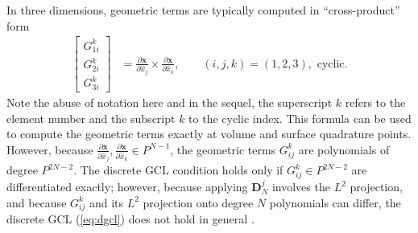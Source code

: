 \documentclass[10pt]{amsart}
\theoremstyle{definition}
\theoremstyle{lemma}
\theoremstyle{theorem}
\theoremstyle{assumption}
\renewcommand{\hat}{\widehat}
\newcommand{\pd}[2]{\frac{\partial#1}{\partial#2}}
\newcommand{\LRs}[1]{\left[ #1 \right]}
\begin{document}
{In three dimensions, geometric terms are typically computed in ``cross-product'' form
\begin{align}
\LRs{\begin{array}{c}
G^k_{1i}\\
G^k_{2i}\\
G^k_{3i}\end{array}} &= \pd{\bm{x}}{\hat{x}_j}\times \pd{\bm{x}}{\hat{x}_k}, \qquad (i,j,k) = (1,2,3), \text{ cyclic}.
\end{align}
Note the abuse of notation here and in the sequel, the superscript $k$ refers to the element number and the subscript $k$ to the cyclic index. 
This formula can be used to compute the geometric terms exactly at volume and surface quadrature points.  However, because $\pd{\bm{x}}{\hat{x}_j},\pd{\bm{x}}{\hat{x}_k} \in P^{N-1}$, the geometric terms $G^k_{ij}$ are polynomials of degree $P^{2N-2}$.  The discrete GCL condition holds only if $G^k_{ij} \in P^{2N-2}$ are differentiated exactly; however, because applying $\bm{D}^j_N$ involves the $L^2$ projection, and because $G^k_{ij}$ and its $L^2$ projection onto degree $N$ polynomials can differ, the discrete GCL (\ref{eq:dgcl}) does not hold in general \cite{kopriva2006metric}.  

}
\end{document}
